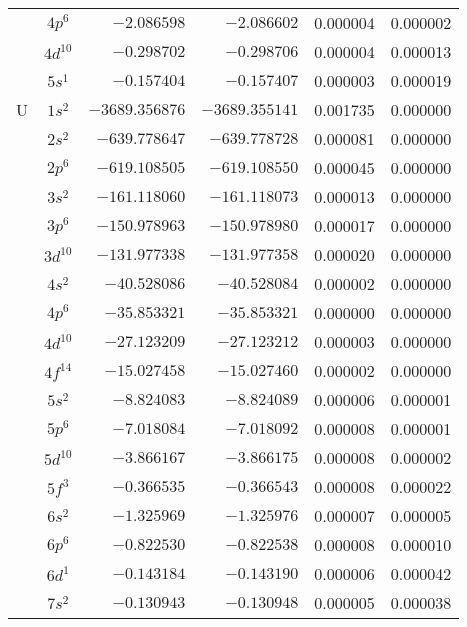 \begin{table}[h!]
\begin{center}
\begin{tabular}{ c | c | r | r | r | r }
    &  $4p^6$  &  $-2.086598$  &  $-2.086602$  &  0.000004  &  0.000002 \\ 
    &  $4d^{10}$  &  $-0.298702$  &  $-0.298706$  &  0.000004  &  0.000013 \\ 
    &  $5s^1$  &  $-0.157404$  &  $-0.157407$  &  0.000003  &  0.000019 \\  \hline
  U &  $1s^2$  &  $-3689.356876$  &  $-3689.355141$  &  0.001735  &  0.000000 \\ 
    &  $2s^2$  &  $-639.778647$  &  $-639.778728$  &  0.000081  &  0.000000 \\ 
    &  $2p^6$  &  $-619.108505$  &  $-619.108550$  &  0.000045  &  0.000000 \\ 
    &  $3s^2$  &  $-161.118060$  &  $-161.118073$  &  0.000013  &  0.000000 \\ 
    &  $3p^6$  &  $-150.978963$  &  $-150.978980$  &  0.000017  &  0.000000 \\ 
    &  $3d^{10}$  &  $-131.977338$  &  $-131.977358$  &  0.000020  &  0.000000 \\ 
    &  $4s^2$  &  $-40.528086$  &  $-40.528084$  &  0.000002  &  0.000000 \\ 
    &  $4p^6$  &  $-35.853321$  &  $-35.853321$  &  0.000000  &  0.000000 \\ 
    &  $4d^{10}$  &  $-27.123209$  &  $-27.123212$  &  0.000003  &  0.000000 \\ 
    &  $4f^{14}$  &  $-15.027458$  &  $-15.027460$  &  0.000002  &  0.000000 \\ 
    &  $5s^2$  &  $-8.824083$  &  $-8.824089$  &  0.000006  &  0.000001 \\ 
    &  $5p^6$  &  $-7.018084$  &  $-7.018092$  &  0.000008  &  0.000001 \\ 
    &  $5d^{10}$  &  $-3.866167$  &  $-3.866175$  &  0.000008  &  0.000002 \\ 
    &  $5f^3$  &  $-0.366535$  &  $-0.366543$  &  0.000008  &  0.000022 \\ 
    &  $6s^2$  &  $-1.325969$  &  $-1.325976$  &  0.000007  &  0.000005 \\ 
    &  $6p^6$  &  $-0.822530$  &  $-0.822538$  &  0.000008  &  0.000010 \\ 
    &  $6d^1$  &  $-0.143184$  &  $-0.143190$  &  0.000006  &  0.000042 \\
    &  $7s^2$  &  $-0.130943$  &  $-0.130948$  &  0.000005  &  0.000038 \\ 
  \hline
\end{tabular}
\end{center}
\end{table}

